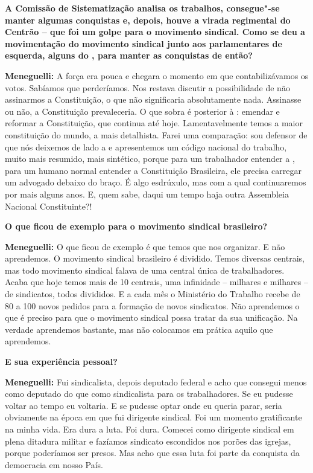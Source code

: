 \textbf{A Comissão de Sistematização analisa os trabalhos, consegue"-se
manter algumas conquistas e, depois, houve a virada regimental do
Centrão -- que foi um golpe para o movimento sindical. Como se deu a
movimentação do movimento sindical junto aos parlamentares de esquerda,
alguns do , para manter as conquistas de então?}

\textbf{Meneguelli:} A força era pouca e chegara o momento em que
contabilizávamos os votos. Sabíamos que perderíamos. Nos restava
discutir a possibilidade de não assinarmos a Constituição, o que não
significaria absolutamente nada. Assinasse ou não, a Constituição
prevaleceria. O que sobra é posterior à : emendar e reformar a
Constituição, que continua até hoje. Lamentavelmente temos a maior
constituição do mundo, a mais detalhista. Farei uma comparação: sou
defensor de que nós deixemos de lado a  e apresentemos um código
nacional do trabalho, muito mais resumido, mais sintético, porque para
um trabalhador entender a , para um humano normal entender a
Constituição Brasileira, ele precisa carregar um advogado debaixo do
braço. É algo esdrúxulo, mas com a qual continuaremos por mais alguns
anos. E, quem sabe, daqui um tempo haja outra Assembleia Nacional
Constituinte?!

\textbf{O que ficou de exemplo para o movimento sindical brasileiro?}

\textbf{Meneguelli:} O que ficou de exemplo é que temos que nos
organizar. E não aprendemos. O movimento sindical brasileiro é dividido.
Temos diversas centrais, mas todo movimento sindical falava de uma
central única de trabalhadores. Acaba que hoje temos mais de 10
centrais, uma infinidade -- milhares e milhares -- de sindicatos, todos
divididos. E a cada mês o Ministério do Trabalho recebe de 80 a 100
novos pedidos para a formação de novos sindicatos. Não aprendemos o que
é preciso para que o movimento sindical possa tratar da sua unificação.
Na verdade aprendemos bastante, mas não colocamos em prática aquilo que
aprendemos.

\textbf{E sua experiência pessoal?}

\textbf{Meneguelli:} Fui sindicalista, depois deputado federal e acho
que consegui menos como deputado do que como sindicalista para os
trabalhadores. Se eu pudesse voltar ao tempo eu voltaria. E se pudesse
optar onde eu queria parar, seria obviamente na época em que fui
dirigente sindical. Foi um momento gratificante na minha vida. Era dura
a luta. Foi dura. Comecei como dirigente sindical em plena ditadura
militar e fazíamos sindicato escondidos nos porões das igrejas, porque
poderíamos ser presos. Mas acho que essa luta foi parte da conquista da
democracia em nosso País.

